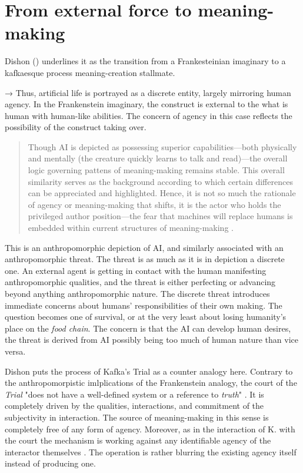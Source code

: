 \section{From external force to meaning-making}\label{sec:From external force to meaning-making} %

Dishon (\citeyear{dishon2024}) underlines it as the transition from a Frankesteinian
imaginary to a kafkaesque process meaning-creation stallmate.

→ Thus, artificial life is portrayed as a discrete entity, largely mirroring
human agency. In the Frankenstein imaginary, the construct is external to the
what is human with human-like abilities. The concern of agency in this case
reflects the possibility of the construct taking over.

\begin{quote}
	Though AI is depicted as possessing superior capabilities—both physically and mentally (the creature quickly learns to talk and read)—the overall logic governing pattens of meaning-making remains stable. This overall similarity serves as the background according to which certain differences can be appreciated and highlighted. Hence, it is not so much the rationale of agency or meaning-making that shifts, it is the actor who holds the privileged author position—the fear that machines will replace humans is embedded within current structures of meaning-making \parencite[966]{dishon2024} .
\end{quote}

This is an anthropomorphic depiction of AI, and similarly associated with an
anthropomorphic threat. The threat is as much as it is in depiction a discrete
one. An external agent is getting in contact with the human manifesting
anthropomorphic qualities, and the threat is either perfecting or advancing beyond
anything anthropomorphic nature. The discrete threat introduces immediate
concerns about humans' responsibilities of their own making. The question
becomes one of survival, or at the very least about losing humanity's place on
the \emph{food chain}. The concern is that the AI can develop human desires,
the threat is derived from AI possibly being too much of human nature than vice
versa.

Dishon \citeyear{dishon2024} puts the process of Kafka's Trial as a counter
analogy here. Contrary to the anthropomorpistic imlplications of the
Frankenstein analogy, the court of the \emph{Trial} "does not have a
well-defined system or a reference to \emph{truth}" \parencite[970]{dishon2024}. It is
completely driven by the qualities, interactions, and commitment %
of the subjectivity in interaction. The source of meaning-making in this sense
is completely free of any form of agency. Moreover, as in the interaction of K. with the court
the mechanism is working against any identifiable agency of the interactor
themselves \parencite[see 970]{dishon2024}. The operation is rather blurring
the existing agency itself instead of producing one.

